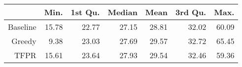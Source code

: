 \begin{table}[ht]
\centering
\begin{tabular}{rrrrrrr}
  \hline
 & Min. & 1st Qu. & Median & Mean & 3rd Qu. & Max. \\ 
  \hline
Baseline & 15.78 & 22.77 & 27.15 & 28.81 & 32.02 & 60.09 \\ 
  Greedy & 9.38 & 23.03 & 27.69 & 29.57 & 32.72 & 65.45 \\ 
  TFPR & 15.61 & 23.64 & 27.93 & 29.54 & 32.46 & 59.36 \\ 
   \hline
\end{tabular}
\end{table}

